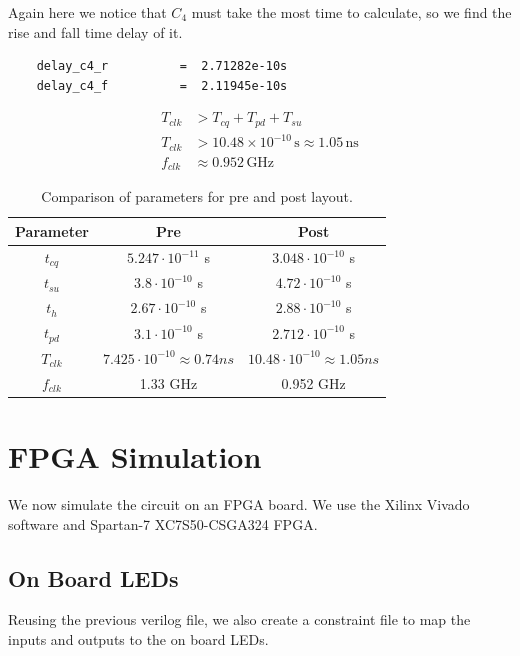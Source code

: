 \documentclass[conference]{IEEEtran}
\begin{document}
Again here we notice that $C_4$ must take the most time to calculate, so we find the rise and fall time delay of it.

\begin{verbatim}
    delay_c4_r          =  2.71282e-10s
    delay_c4_f          =  2.11945e-10s
\end{verbatim}

\begin{align}
    T_{clk} &> T_{cq} + T_{pd} + T_{su} \\
    T_{clk} &> 10.48 \times 10^{-10} \, \text{s} \approx 1.05 \, \text{ns} \\
    f_{clk} &\approx 0.952 \, \text{GHz}
\end{align}

\begin{table}[H]
    \centering
    \begin{tabular}{|c|c|c|}
        \hline
        \textbf{Parameter} & \textbf{Pre} & \textbf{Post} \\
        \hline
        $t_{cq}$ & $5.247 \cdot 10^{-11}$ s & $3.048 \cdot 10^{-10}$ s \\
        \hline
        $t_{su}$ & $3.8 \cdot 10^{-10}$ s & $4.72 \cdot 10^{-10}$ s\\
        \hline
        $t_{h}$ & $2.67 \cdot 10^{-10}$ s & $2.88 \cdot 10^{-10}$ s\\
        \hline
        $t_{pd}$ & $3.1 \cdot 10^{-10}$ s & $2.712 \cdot 10^{-10}$ s\\
        \hline
        $T_{clk}$ & $7.425 \cdot 10^{-10} \approx 0.74ns$ & $10.48 \cdot 10^{-10} \approx 1.05ns$\\
        \hline
        $f_{clk}$ & 1.33 GHz & 0.952 GHz\\
        \hline
    \end{tabular}
    \caption{Comparison of parameters for pre and post layout.}
\end{table}

\section{FPGA Simulation}

We now simulate the circuit on an FPGA board. We use the Xilinx Vivado software and Spartan-7 XC7S50-CSGA324 FPGA. 

\subsection{On Board LEDs}
Reusing the previous verilog file, we also create a constraint file to map the inputs and outputs to the on board LEDs.
\end{document}
